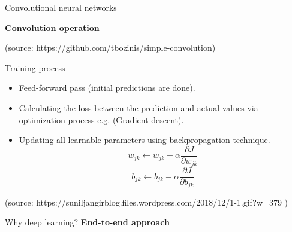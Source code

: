 \documentclass[10pt,aspectratio=169]{beamer} %
\begin{document}
\setcounter{subfigure}{0}
\begin{frame}{Convolutional neural networks}
	\begin{minipage}[c]{0.35\textwidth}
		\textbf{Convolution operation}\\
	\end{minipage}
	\begin{minipage}[0]{0.6\textwidth}
	\end{minipage}
	\tiny
	(source: https://github.com/tbozinis/simple-convolution)
\end{frame}
\setcounter{subfigure}{0}
\begin{frame}{Training process}
	
	\begin{minipage}[ct]{0.4\textwidth}
			\begin{itemize}
				\footnotesize
				\item Feed-forward pass (initial predictions are done).
				\item Calculating the loss between the prediction and actual  values via optimization process e.g. (Gradient descent).
				\item Updating all learnable parameters using backpropagation technique.				
				\begin{equation}
					w_{jk}\leftarrow w_{jk}-\alpha \frac{\partial J}{\partial w_{jk}}					
				\end{equation}
				\begin{equation}										
					b_{jk}\leftarrow b_{jk}-\alpha \frac{\partial J}{\partial b_{jk}}
				\end{equation}
			\end{itemize}
		
	\end{minipage}
\hfill
	\begin{minipage}[c]{0.55\textwidth}
		\begin{figure}
			\centering
		\end{figure}
	\tiny
	(source: https://suniljangirblog.files.wordpress.com/2018/12/1-1.gif?w=379
	)
	\end{minipage}

\end{frame}
\begin{frame}{Why deep learning?}
	\centering
	\textbf{End-to-end approach} 
	\par\medskip
\end{frame}
\end{document}
